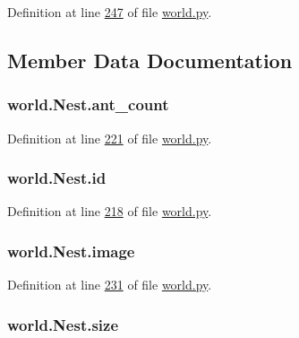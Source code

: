Definition at line \hyperlink{world_8py_source_l00247}{247} of file \hyperlink{world_8py_source}{world.\+py}.



\subsection{Member Data Documentation}
\hypertarget{classworld_1_1Nest_aa41cdaa8399fe934d89f5573ff804cbc}{
\subsubsection[{ant\+\_\+count}]{\setlength{\rightskip}{0pt plus 5cm}world.\+Nest.\+ant\+\_\+count}}\label{classworld_1_1Nest_aa41cdaa8399fe934d89f5573ff804cbc}


Definition at line \hyperlink{world_8py_source_l00221}{221} of file \hyperlink{world_8py_source}{world.\+py}.

\hypertarget{classworld_1_1Nest_a2ab2394f7ded6041e64cfea7390519c3}{
\subsubsection[{id}]{\setlength{\rightskip}{0pt plus 5cm}world.\+Nest.\+id}}\label{classworld_1_1Nest_a2ab2394f7ded6041e64cfea7390519c3}


Definition at line \hyperlink{world_8py_source_l00218}{218} of file \hyperlink{world_8py_source}{world.\+py}.

\hypertarget{classworld_1_1Nest_a1d943529c7685aa0cadeb43f9891ff03}{
\subsubsection[{image}]{\setlength{\rightskip}{0pt plus 5cm}world.\+Nest.\+image}}\label{classworld_1_1Nest_a1d943529c7685aa0cadeb43f9891ff03}


Definition at line \hyperlink{world_8py_source_l00231}{231} of file \hyperlink{world_8py_source}{world.\+py}.

\hypertarget{classworld_1_1Nest_a779ec4ef0582e917964de4efaedaef84}{
\subsubsection[{size}]{\setlength{\rightskip}{0pt plus 5cm}world.\+Nest.\+size}}\label{classworld_1_1Nest_a779ec4ef0582e917964de4efaedaef84}


